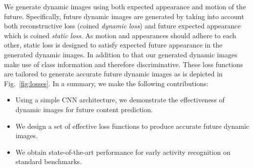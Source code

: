 We generate dynamic images using both expected appearance and motion of the future.
Specifically, future dynamic images are generated by taking into account both reconstructive loss (coined \emph{dynamic loss}) and future expected appearance which is coined \emph{static loss}.
As motion and appearances should adhere to each other, static loss is designed to satisfy expected future appearance in the generated
dynamic images.
In addition to that our generated dynamic images make use of class information and therefore discriminative.
These loss functions are tailored to generate accurate future dynamic images as is depicted in Fig.~\ref{fig:losses}.
In a summary, we make the following contributions:
\begin{itemize}
 \item Using a simple CNN architecture, we demonstrate the effectiveness of dynamic images for future content prediction.
 \item We design a set of effective loss functions to produce accurate future dynamic images.
 \item We obtain state-of-the-art performance for early activity recognition on standard benchmarks.
\end{itemize}


